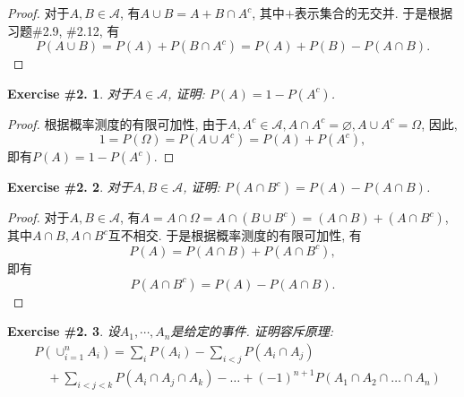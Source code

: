 \documentclass[UTF8, a4paper]{article}
\newtheorem{exercise}{Exercise \#2.}
\begin{document}
\begin{proof}
    对于\(A,B \in \mathcal{A}\), 有\(A \cup B = A + B\cap A^c\), 其中\(+\)表示集合的无交并.
    于是根据习题\#2.9, \#2.12, 有
    $$
    P(A\cup B) = P(A) + P(B\cap A^c) = P(A) + P(B) - P(A\cap B).
    $$
\end{proof}


\begin{framed}
\begin{exercise}
    对于\(A\in \mathcal{A}\), 证明: \(P(A) = 1 - P(A^c)\).
\end{exercise}
\end{framed}

\begin{proof}
根据概率测度的有限可加性, 由于\(A, A^c \in \mathcal{A}, A\cap A^c = \varnothing, A\cup A^c = \Omega\), 因此, 
$$
1 = P(\Omega) = P(A \cup A^c) = P(A) + P(A^c), 
$$
即有\(P(A) = 1 - P(A^c)\).
\end{proof}


\begin{framed}
\begin{exercise}
    对于\(A,B \in \mathcal{A}\), 证明: \(P(A\cap B^c) = P(A) - P(A \cap B)\).
\end{exercise}
\end{framed}

\begin{proof}
    对于\(A,B \in \mathcal{A}\), 有\(A = A\cap \Omega = A\cap (B\cup B^c) = (A\cap B) + (A\cap B^c)\), 其中\(A\cap B, A\cap B^c\)互不相交. 
    于是根据概率测度的有限可加性, 有
    $$
    P(A) = P(A\cap B) + P(A\cap B^c), 
    $$
    即有
    $$
    P(A\cap B^c) = P(A) - P(A\cap B).
    $$
\end{proof}



\begin{framed}
\begin{exercise}
    设\(A_1, \cdots, A_n\)是给定的事件. 证明容斥原理:
$$
\begin{aligned}
& P\left(\cup_{i=1}^n A_i\right)=\sum_i P\left(A_i\right)-\sum_{i<j} P\left(A_i \cap A_j\right) \\
& \quad+\sum_{i<j<k} P\left(A_i \cap A_j \cap A_k\right)-\ldots+(-1)^{n+1} P\left(A_1 \cap A_2 \cap \ldots \cap A_n\right)
\end{aligned}
$$
\end{exercise}
\end{framed}
\end{document}
